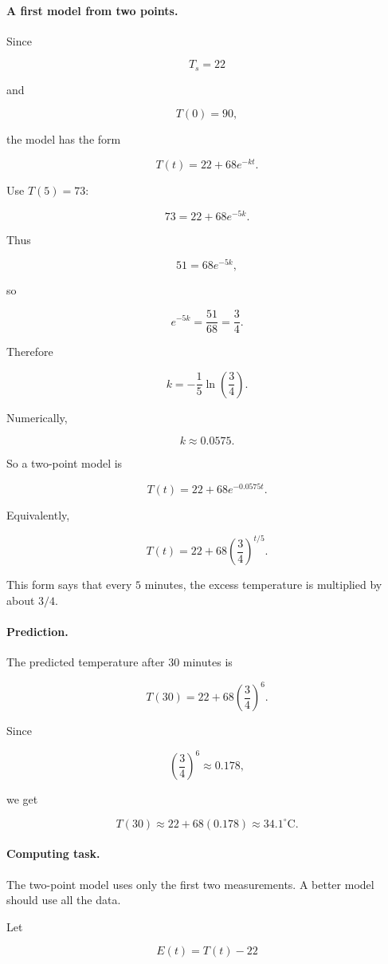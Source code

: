 \paragraph{A first model from two points.}
Since

\[
T_s=22
\]

and

\[
T(0)=90,
\]

the model has the form

\[
T(t)=22+68e^{-kt}.
\]

Use \(T(5)=73\):

\[
73=22+68e^{-5k}.
\]

Thus

\[
51=68e^{-5k},
\]

so

\[
e^{-5k}=\frac{51}{68}=\frac34.
\]

Therefore

\[
k=-\frac15\ln\left(\frac34\right).
\]

Numerically,

\[
k\approx0.0575.
\]

So a two-point model is

\[
\boxed{
T(t)=22+68e^{-0.0575t}.
}
\]

Equivalently,

\[
T(t)=22+68\left(\frac34\right)^{t/5}.
\]

This form says that every \(5\) minutes, the excess temperature is multiplied by
about \(3/4\).

\paragraph{Prediction.}
The predicted temperature after \(30\) minutes is

\[
T(30)=22+68\left(\frac34\right)^6.
\]

Since

\[
\left(\frac34\right)^6\approx0.178,
\]

we get

\[
T(30)\approx22+68(0.178)\approx34.1^\circ\text{C}.
\]

\paragraph{Computing task.}
The two-point model uses only the first two measurements.  A better model should
use all the data.

Let

\[
E(t)=T(t)-22
\]

